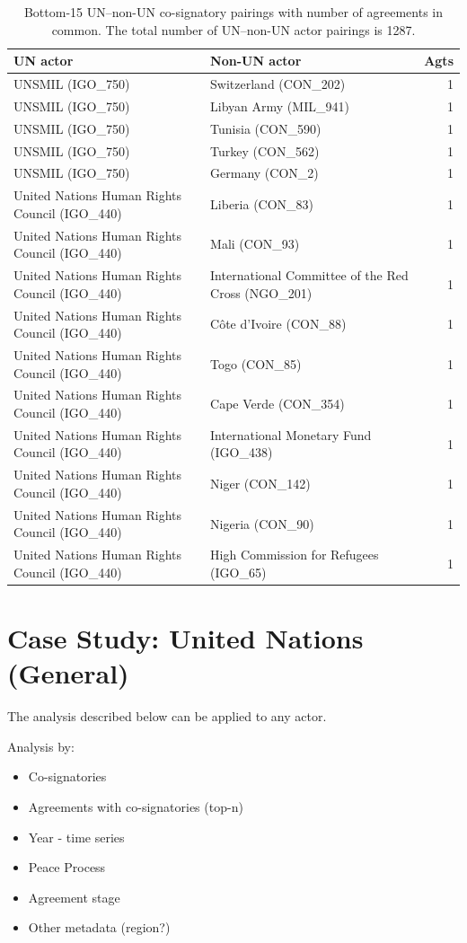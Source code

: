 \documentclass{article}
\begin{document}
\begin{table}[H]
\begin{center}
\small
\begin{tabularx}{\textwidth}{|X|X|r|}
    \hline
    \textbf{UN actor} & \textbf{Non-UN actor} & \textbf{Agts} \\
    \hline
    \hline
UNSMIL (IGO\_750) & Switzerland (CON\_202) & 1 \\
\hline
UNSMIL (IGO\_750) & Libyan Army (MIL\_941) & 1 \\
\hline
UNSMIL (IGO\_750) & Tunisia (CON\_590) & 1 \\
\hline
UNSMIL (IGO\_750) & Turkey (CON\_562) & 1 \\
\hline
UNSMIL (IGO\_750) & Germany (CON\_2) & 1 \\
\hline
United Nations Human Rights Council (IGO\_440) & Liberia (CON\_83) & 1 \\
\hline
United Nations Human Rights Council (IGO\_440) & Mali (CON\_93) & 1 \\
\hline
United Nations Human Rights Council (IGO\_440) & International Committee of the Red Cross (NGO\_201) & 1 \\
\hline
United Nations Human Rights Council (IGO\_440) & Côte d’Ivoire (CON\_88) & 1 \\
\hline
United Nations Human Rights Council (IGO\_440) & Togo (CON\_85) & 1 \\
\hline
United Nations Human Rights Council (IGO\_440) & Cape Verde (CON\_354) & 1 \\
\hline
United Nations Human Rights Council (IGO\_440) & International Monetary Fund (IGO\_438) & 1 \\
\hline
United Nations Human Rights Council (IGO\_440) & Niger (CON\_142) & 1 \\
\hline
United Nations Human Rights Council (IGO\_440) & Nigeria (CON\_90) & 1 \\
\hline
United Nations Human Rights Council (IGO\_440) & High Commission for Refugees (IGO\_65) & 1 \\
\hline
\end{tabularx}
\end{center}
\normalsize
\caption{Bottom-15 UN--non-UN co-signatory pairings with number of agreements in common. The total number of UN--non-UN actor pairings is 1287.}
\end{table}

\pagebreak

\section{Case Study: United Nations (General) }

The analysis described below can be applied to any actor.

Analysis by:

\begin{itemize}
\item Co-signatories
\item Agreements with co-signatories (top-n)
\item Year - time series
\item Peace Process
\item Agreement stage
\item Other metadata (region?)
\end{itemize}
 
\end{document}
